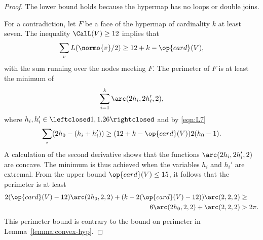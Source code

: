 \begin{proof} The lower bound holds because the hypermap has no loops
  or double joins.  

For a contradiction, let $F$ be a face of the
  hypermap of cardinality $k$ at least seven.  The inequality $\CalL(V)\ge 12$
implies that
\begin{equation}\label{eqn:L7}
\sum_{v} L(\normo{v}/2) \ge 12+k-\op{card}(V),
\end{equation}
with the sum running over the nodes meeting $F$.
The perimeter of $F$ is at least the minimum of
\[
\sum_{i=1}^k \arc(2h_i,2h_i',2),
\]
where $h_i,h_i'\in \leftclosed 1,1.26\rightclosed$ and by \eqref{eqn:L7}
\[
\sum_{i} (2h_0 - (h_i+h_i')) \ge (12+k - \op{card}(V)) 2 (h_0-1).
\]
A calculation of the second derivative shows that the functions $\arc(2h_i,2h_i',2)$ are concave.
The minimum is thus achieved when the variables $h_i$ and $h_i'$ are extremal.  From
the upper bound $\op{card}(V)\le 15$, it follows that the perimeter
is at least
\begin{align*}
2 (\op{card}(V) -12) \arc(2h_0,2,2) + (k - 2(\op{card}(V)-12)) \arc(2,2,2) &\ge\\
6 \arc(2h_0,2,2) + \arc(2,2,2) &> 2\pi.
\end{align*}
This perimeter bound is contrary to the bound on
perimeter in Lemma~\ref{lemma:convex-hyp}.
\end{proof}


%
%





